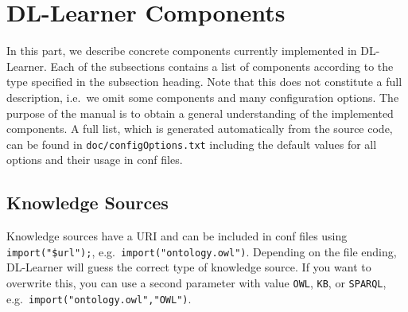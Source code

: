 \documentclass[a4paper,12pt]{scrartcl}
\begin{document}
\section{DL-Learner Components}
\label{sec:components}

In this part, we describe concrete components currently implemented in DL-Learner. Each of the subsections contains a list of components according to the type specified in the subsection heading. Note that this does not constitute a full description, i.e.~we omit some components and many configuration options. The purpose of the manual is to obtain a general understanding of the implemented components. A full list, which is generated automatically from the source code, can be found in \verb|doc/configOptions.txt| including the default values for all options and their usage in conf files.

\subsection{Knowledge Sources}

Knowledge sources have a URI and can be included in conf files using \verb|import("$url");|, e.g.~\verb|import("ontology.owl")|. Depending on the file ending, DL-Learner will guess the correct type of knowledge source. If you want to overwrite this, you can use a second parameter with value \verb|OWL|, \verb|KB|, or \verb|SPARQL|, e.g.~\verb|import("ontology.owl","OWL")|.
\end{document}
